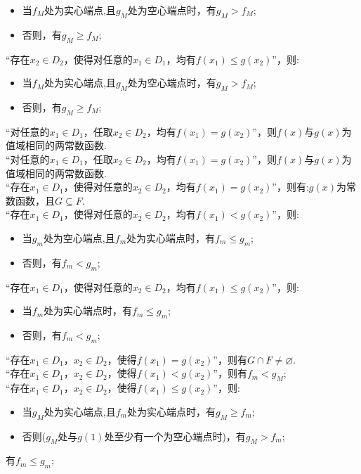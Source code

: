 \begin{itemize}
    \item 当$f_M$处为实心端点,且$g_M$处为空心端点时，有$g_M>f_M$;
    \item 否则，有$g_M\geqslant f_M$;
\end{itemize}
“存在$x_2\in D_2$，使得对任意的$x_1\in D_1$，均有$f(x_1) \leqslant g(x_2)$”，则:
\begin{itemize}
    \item 当$f_M$处为实心端点,且$g_M$处为空心端点时，有$g_M>f_M$;
    \item 否则，有$g_M\geqslant f_M$;
\end{itemize}
\newline
“对任意的$x_1\in D_1$，任取$x_2\in D_2$，均有$f(x_1)=g(x_2)$”，则$f(x)$与$g(x)$为值域相同的两常数函数.\\%
“对任意的$x_1\in D_1$，任取$x_2\in D_2$，均有$f(x_1)=g(x_2)$”，则$f(x)$与$g(x)$为值域相同的两常数函数.\\%
“存在$x_1\in D_1$，使得对任意的$x_2\in D_2$，均有$f(x_1)=g(x_2)$”，则有:$g(x)$为常数函数，且$G\subseteq F$.\\
“存在$x_1\in D_1$，使得对任意的$x_2\in D_2$，均有$f(x_1)<g(x_2)$”，则:
\begin{itemize}
    \item 当$g_m$处为空心端点,且$f_m$处为实心端点时，有$f_m\leqslant g_m$;
    \item 否则，有$f_m<g_m$;
\end{itemize}
“存在$x_1\in D_1$，使得对任意的$x_2\in D_2$，均有$f(x_1)\leqslant g(x_2)$”，则:
\begin{itemize}
    \item 当$f_m$处为实心端点时，有$f_m\leqslant g_m$;
    \item 否则，有$f_m<g_m$;
\end{itemize}
\newline
“存在$x_1\in D_1$，$x_2\in D_2$，使得$f(x_1)=g(x_2)$”，则有$G\cap F\neq \varnothing$.\\
“存在$x_1\in D_1$，$x_2\in D_2$，使得$f(x_1)<g(x_2)$”，则有$f_m<g_M$;\\
“存在$x_1\in D_1$，$x_2\in D_2$，使得$f(x_1) \leqslant g(x_2)$”，则:
\begin{itemize}
    \item 当$g_M$处为实心端点,且$f_m$处为实心端点时，有$g_M \geqslant f_m$;
    \item 否则($g_M$处与$g(1)$处至少有一个为空心端点时)，有$g_M>f_m$;
\end{itemize}有$f_m\leqslant g_m$;







